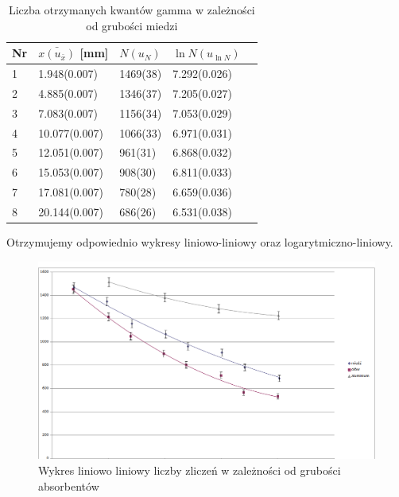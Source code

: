 \documentclass[a4paper]{article}
\begin{document}
\begin{table}[h!]
\centering
\begin{tabular}{ | l | l | l | l | l | }
\hline
Nr & $\bar{x(u_{\bar{x}})}$ [mm] & $N(u_N)$ & $\ln{N}(u_{\ln{N}})$ \\ \hline
1 & 1.948(0.007) & 1469(38) & 7.292(0.026)  \\ \hline
2 & 4.885(0.007) & 1346(37) & 7.205(0.027)  \\ \hline
3 & 7.083(0.007) & 1156(34) & 7.053(0.029) \\ \hline
4 & 10.077(0.007) & 1066(33) & 6.971(0.031) \\ \hline
5 & 12.051(0.007) & 961(31) & 6.868(0.032) \\ \hline
6 & 15.053(0.007) & 908(30) & 6.811(0.033) \\ \hline
7 & 17.081(0.007) & 780(28) & 6.659(0.036) \\ \hline
8 & 20.144(0.007) & 686(26) & 6.531(0.038) \\ \hline   
\end{tabular}
\caption{Liczba otrzymanych kwantów gamma w zależności od grubości miedzi}
\label{pomiary_sruba}
\end{table}

Otrzymujemy odpowiednio wykresy liniowo-liniowy oraz logarytmiczno-liniowy.
\begin{figure}[h!]
\centering
\includegraphics[scale=0.51]{liniowo_liniowy.png}
\caption{Wykres liniowo liniowy liczby zliczeń w zależności od grubości absorbentów}
\label{uklad_pomiarowy}
\end{figure}
\end{document}
